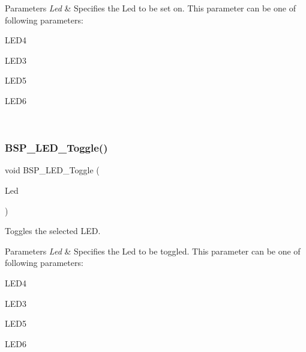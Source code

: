 \begin{DoxyParams}{Parameters}
{\em Led} & Specifies the Led to be set on. This parameter can be one of following parameters\+: \begin{DoxyItemize}
\item L\+E\+D4 \item L\+E\+D3 \item L\+E\+D5 \item L\+E\+D6 \end{DoxyItemize}
\\
\hline
\end{DoxyParams}
\mbox{\label{group___s_t_m32_f4___d_i_s_c_o_v_e_r_y___l_o_w___l_e_v_e_l___l_e_d___functions_ga1b9eabba7d498f41d6f16587ec0f9732}} 
\subsubsection{\texorpdfstring{B\+S\+P\+\_\+\+L\+E\+D\+\_\+\+Toggle()}{BSP\_LED\_Toggle()}}
{\footnotesize\ttfamily void B\+S\+P\+\_\+\+L\+E\+D\+\_\+\+Toggle (\begin{DoxyParamCaption}\item[{Led\+\_\+\+Type\+Def}]{Led }\end{DoxyParamCaption})}



Toggles the selected L\+ED. 


\begin{DoxyParams}{Parameters}
{\em Led} & Specifies the Led to be toggled. This parameter can be one of following parameters\+: \begin{DoxyItemize}
\item L\+E\+D4 \item L\+E\+D3 \item L\+E\+D5 \item L\+E\+D6 \end{DoxyItemize}
\\
\hline
\end{DoxyParams}
